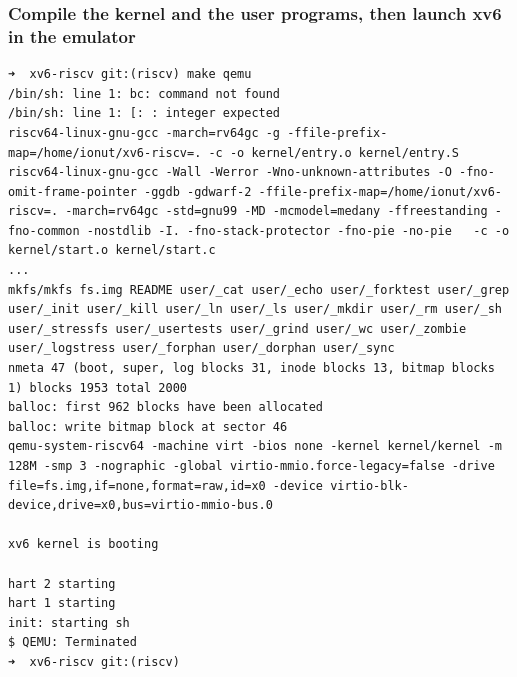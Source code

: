 \documentclass{labreport}
\begin{document}
\subsubsection{Compile the kernel and the user programs, then launch xv6 in the emulator}
\begin{lstlisting}[style=bash]
➜  xv6-riscv git:(riscv) make qemu
/bin/sh: line 1: bc: command not found
/bin/sh: line 1: [: : integer expected
riscv64-linux-gnu-gcc -march=rv64gc -g -ffile-prefix-map=/home/ionut/xv6-riscv=. -c -o kernel/entry.o kernel/entry.S
riscv64-linux-gnu-gcc -Wall -Werror -Wno-unknown-attributes -O -fno-omit-frame-pointer -ggdb -gdwarf-2 -ffile-prefix-map=/home/ionut/xv6-riscv=. -march=rv64gc -std=gnu99 -MD -mcmodel=medany -ffreestanding -fno-common -nostdlib -I. -fno-stack-protector -fno-pie -no-pie   -c -o kernel/start.o kernel/start.c
...
mkfs/mkfs fs.img README user/_cat user/_echo user/_forktest user/_grep user/_init user/_kill user/_ln user/_ls user/_mkdir user/_rm user/_sh user/_stressfs user/_usertests user/_grind user/_wc user/_zombie user/_logstress user/_forphan user/_dorphan user/_sync
nmeta 47 (boot, super, log blocks 31, inode blocks 13, bitmap blocks 1) blocks 1953 total 2000
balloc: first 962 blocks have been allocated
balloc: write bitmap block at sector 46
qemu-system-riscv64 -machine virt -bios none -kernel kernel/kernel -m 128M -smp 3 -nographic -global virtio-mmio.force-legacy=false -drive file=fs.img,if=none,format=raw,id=x0 -device virtio-blk-device,drive=x0,bus=virtio-mmio-bus.0

xv6 kernel is booting

hart 2 starting
hart 1 starting
init: starting sh
$ QEMU: Terminated
➜  xv6-riscv git:(riscv)
\end{lstlisting}
\end{document}
